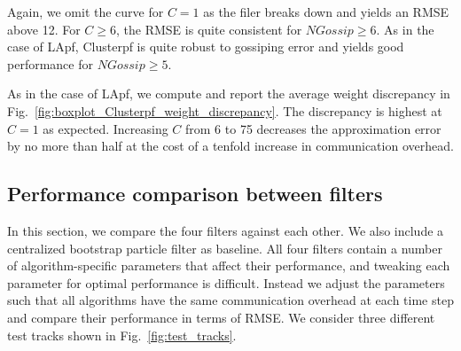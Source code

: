 \documentclass[10pt,letterpaper,final]{article}
\begin{document}
Again, we omit the curve for $C=1$ as the filer breaks down and yields an RMSE above 12. For $C\geq 6$, the RMSE is quite consistent for $NGossip \geq 6$. As in the case of LApf, Clusterpf is quite robust to gossiping error and yields good performance for $NGossip \geq 5$. 

As in the case of LApf, we compute and report the average weight discrepancy in Fig.~\ref{fig:boxplot_Clusterpf_weight_discrepancy}. The discrepancy is highest at $C=1$ as expected. Increasing $C$ from 6 to 75 decreases the approximation error by no more than half at the cost of a tenfold increase in communication overhead. 

\subsection{Performance comparison between filters}
In this section, we compare the four filters against each other. We also include a centralized bootstrap particle filter as baseline. All four filters contain a number of algorithm-specific parameters that affect their performance, and tweaking each parameter for optimal performance is difficult. Instead we adjust the parameters such that all algorithms have the same communication overhead at each time step and compare their performance in terms of RMSE. We consider three different test tracks shown in Fig.~\ref{fig:test_tracks}. 
\end{document}
